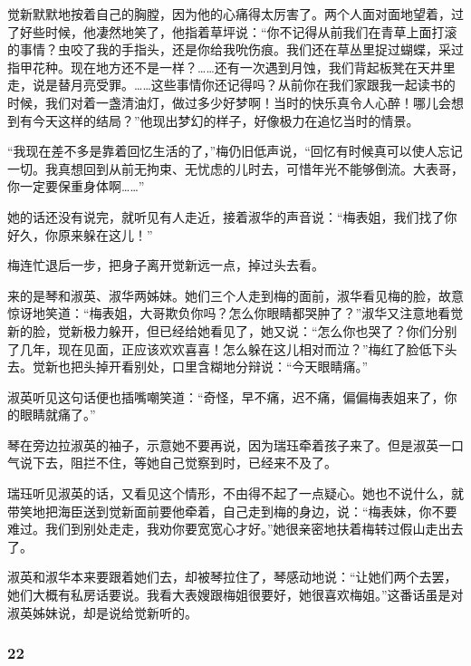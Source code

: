 \par 觉新默默地按着自己的胸膛，因为他的心痛得太厉害了。两个人面对面地望着，过了好些时候，他凄然地笑了，他指着草坪说：“你不记得从前我们在青草上面打滚的事情？虫咬了我的手指头，还是你给我吮伤痕。我们还在草丛里捉过蝴蝶，采过指甲花种。现在地方还不是一样？……还有一次遇到月蚀，我们背起板凳在天井里走，说是替月亮受罪。……这些事情你还记得吗？从前你在我们家跟我一起读书的时候，我们对着一盏清油灯，做过多少好梦啊！当时的快乐真令人心醉！哪儿会想到有今天这样的结局？”他现出梦幻的样子，好像极力在追忆当时的情景。
\par “我现在差不多是靠着回忆生活的了，”梅仍旧低声说，“回忆有时候真可以使人忘记一切。我真想回到从前无拘束、无忧虑的儿时去，可惜年光不能够倒流。大表哥，你一定要保重身体啊……”
\par 她的话还没有说完，就听见有人走近，接着淑华的声音说：“梅表姐，我们找了你好久，你原来躲在这儿！”
\par 梅连忙退后一步，把身子离开觉新远一点，掉过头去看。
\par 来的是琴和淑英、淑华两姊妹。她们三个人走到梅的面前，淑华看见梅的脸，故意惊讶地笑道：“梅表姐，大哥欺负你吗？怎么你眼睛都哭肿了？”淑华又注意地看觉新的脸，觉新极力躲开，但已经给她看见了，她又说：“怎么你也哭了？你们分别了几年，现在见面，正应该欢欢喜喜！怎么躲在这儿相对而泣？”梅红了脸低下头去。觉新也把头掉开看别处，口里含糊地分辩说：“今天眼睛痛。”
\par 淑英听见这句话便也插嘴嘲笑道：“奇怪，早不痛，迟不痛，偏偏梅表姐来了，你的眼睛就痛了。”
\par 琴在旁边拉淑英的袖子，示意她不要再说，因为瑞珏牵着孩子来了。但是淑英一口气说下去，阻拦不住，等她自己觉察到时，已经来不及了。
\par 瑞珏听见淑英的话，又看见这个情形，不由得不起了一点疑心。她也不说什么，就带笑地把海臣送到觉新面前要他牵着，自己走到梅的身边，说：“梅表妹，你不要难过。我们到别处走走，我劝你要宽宽心才好。”她很亲密地扶着梅转过假山走出去了。
\par 淑英和淑华本来要跟着她们去，却被琴拉住了，琴感动地说：“让她们两个去罢，她们大概有私房话要说。我看大表嫂跟梅姐很要好，她很喜欢梅姐。”这番话虽是对淑英姊妹说，却是说给觉新听的。



\subsubsection*{22}

